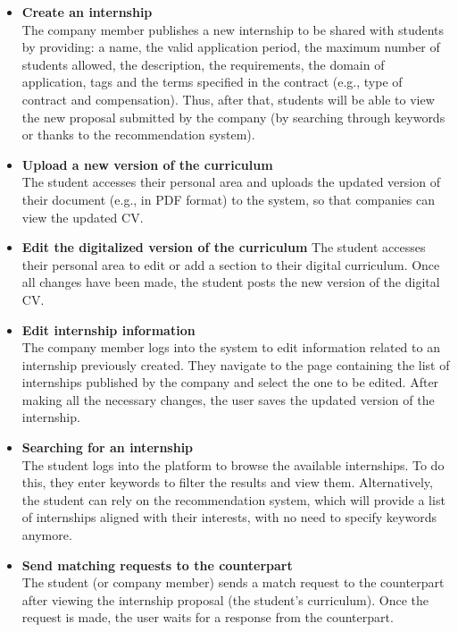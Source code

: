 \begin{itemize}
      \item \textbf{Create an internship} \\
      The company member publishes a new internship to be shared with students by providing: a name, the valid application period, the maximum number of students allowed, the description, the requirements, the domain of application, tags and the terms specified in the contract (e.g., type of contract and compensation).
      Thus, after that, students will be able to view the new proposal submitted by the company (by searching through keywords or thanks to the recommendation system).
      
      \item \textbf{Upload a new version of the curriculum} \\
      The student accesses their personal area and uploads the updated version of their document (e.g., in PDF format) to the system, so that companies can view the updated CV.
      
      \item \textbf{Edit the digitalized version of the curriculum}
      The student accesses their personal area to edit or add a section to their digital curriculum.
      Once all changes have been made, the student posts the new version of the digital CV.

      \item \textbf{Edit internship information} \\
      The company member logs into the system to edit information related to an internship previously created. They navigate to the page containing the list of internships published by the company and select the one to be edited. After making all the necessary changes, the user saves the updated version of the internship.

      \item \textbf{Searching for an internship} \\
      The student logs into the platform to browse the available internships. To do this, they enter keywords to filter the results and view them. Alternatively, the student can rely on the recommendation system, which will provide a list of internships aligned with their interests, with no need to specify keywords anymore.
      
      \item \textbf{Send matching requests to the counterpart} \\
      The student (or company member) sends a match request to the counterpart after viewing the internship proposal (the student's curriculum). Once the request is made, the user waits for a response from the counterpart.
      

\end{itemize}
